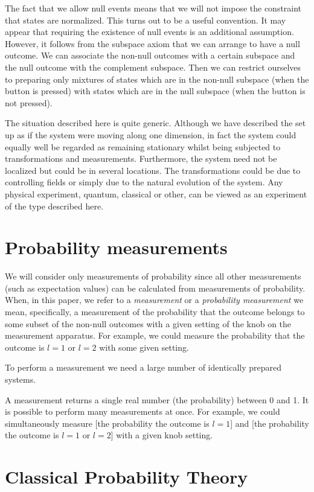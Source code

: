 \documentclass[10pt,twocolumn]{article}
\begin{document}
The fact that we allow null events means that we will not impose the
constraint that states are normalized.  This turns out to be a useful
convention.  It may appear that requiring the existence of null events
is an additional assumption.  However, it follows from the subspace
axiom that we can arrange to have a null outcome.
We can associate the non-null outcomes with a certain subspace and the
null outcome with the complement subspace.  Then we can restrict
ourselves to preparing only mixtures of states which are in the non-null
subspace (when the button is pressed) with states which are in the
null subspace (when the button is not pressed).

The situation described here is quite generic.  Although we have described
the set up as if the system were moving along one dimension, in fact the
system
could equally well be regarded as remaining stationary whilst being
subjected to transformations and measurements. Furthermore, the system
need not be localized but could be in several locations. The
transformations could be due to controlling fields or simply due to the
natural evolution of the system. Any physical experiment, quantum,
classical or other, can be viewed as an experiment of the type described here.


\section{Probability measurements}


We will consider only measurements of probability since all other
measurements (such as expectation values) can be calculated from
measurements of probability.  When, in this paper, we refer to a {\it
measurement} or a {\it probability measurement} we mean, specifically, a
measurement of the probability that the outcome belongs to some subset
of the non-null outcomes with a given setting of the knob on the
measurement apparatus.  For example, we could measure the probability
that the outcome is $l=1$ or $l=2$ with some given setting.

To perform a measurement we need a large number of identically prepared
systems.

A measurement returns a single real number (the probability)
between 0 and 1.  It is possible to perform many measurements at once.
For example, we could simultaneously measure [the probability the
outcome is $l=1$] and [the probability the outcome is $l=1$ or $l=2$]
with a given knob setting.

\section{Classical Probability Theory}
\end{document}
